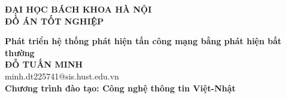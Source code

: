 \documentclass[DoAn.tex]{subfiles}
\begin{document}
\begin{titlepage}
\thispagestyle{empty}
\begin{center}

{\textbf{\large{ĐẠI HỌC BÁCH KHOA HÀ NỘI}}}\\[4cm]

{\textbf{\huge{ ĐỒ ÁN TỐT NGHIỆP}}}\\[1cm]
{\textbf{\Large{Phát triển hệ thống phát hiện tấn công mạng bằng phát hiện bất thường}}\\[1cm]

{\textbf{\large{ĐỖ TUẤN MINH}}}\\
{\large{minh.dt225741@sis.hust.edu.vn}}\\[0.5cm]

{\textbf{\large{Chương trình đào tạo: Công nghệ thông tin Việt-Nhật
}}}\\

\vspace{4cm}
\begin{table}[H]
\centering
{}
\end{table}}
\end{center}



\end{titlepage}
\end{document}
